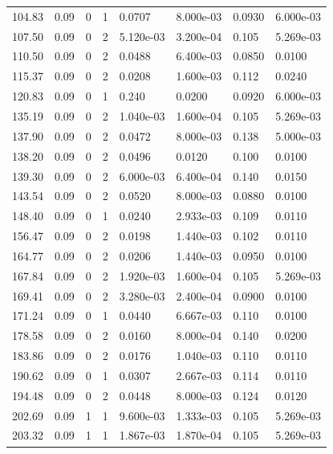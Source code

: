 \documentclass[preview]{standalone}
\begin{document}
{{\begin{tabular}{L{1.2cm}C{1.2cm} C{0.3cm}C{0.5cm} C{1.4cm}C{1.4cm} C{1.4cm}C{1.4cm}}
  104.83  &  0.09  & 0     &  1 &  0.0707  & 8.000e-03  & 0.0930 &  6.000e-03   \\ 
  107.50  &  0.09  & 0     &  2 &  5.120e-03  & 3.200e-04  & 0.105 &  5.269e-03   \\ 
  110.50  &  0.09  & 0     &  2 &  0.0488  & 6.400e-03  & 0.0850 &  0.0100   \\ 
  115.37  &  0.09  & 0     &  2 &  0.0208  & 1.600e-03  & 0.112 &  0.0240   \\ 
  120.83  &  0.09  & 0     &  1 &  0.240  & 0.0200  & 0.0920 &  6.000e-03   \\ 
  135.19  &  0.09  & 0     &  2 &  1.040e-03  & 1.600e-04  & 0.105 &  5.269e-03   \\ 
  137.90  &  0.09  & 0     &  2 &  0.0472  & 8.000e-03  & 0.138 &  5.000e-03   \\ 
  138.20  &  0.09  & 0     &  2 &  0.0496  & 0.0120  & 0.100 &  0.0100   \\ 
  139.30  &  0.09  & 0     &  2 &  6.000e-03  & 6.400e-04  & 0.140 &  0.0150   \\ 
  143.54  &  0.09  & 0     &  2 &  0.0520  & 8.000e-03  & 0.0880 &  0.0100   \\ 
  148.40  &  0.09  & 0     &  1 &  0.0240  & 2.933e-03  & 0.109 &  0.0110   \\ 
  156.47  &  0.09  & 0     &  2 &  0.0198  & 1.440e-03  & 0.102 &  0.0110   \\ 
  164.77  &  0.09  & 0     &  2 &  0.0206  & 1.440e-03  & 0.0950 &  0.0100   \\ 
  167.84  &  0.09  & 0     &  2 &  1.920e-03  & 1.600e-04  & 0.105 &  5.269e-03   \\ 
  169.41  &  0.09  & 0     &  2 &  3.280e-03  & 2.400e-04  & 0.0900 &  0.0100   \\ 
  171.24  &  0.09  & 0     &  1 &  0.0440  & 6.667e-03  & 0.110 &  0.0100   \\ 
  178.58  &  0.09  & 0     &  2 &  0.0160  & 8.000e-04  & 0.140 &  0.0200   \\ 
  183.86  &  0.09  & 0     &  2 &  0.0176  & 1.040e-03  & 0.110 &  0.0110   \\ 
  190.62  &  0.09  & 0     &  1 &  0.0307  & 2.667e-03  & 0.114 &  0.0110   \\ 
  194.48  &  0.09  & 0     &  2 &  0.0448  & 8.000e-03  & 0.124 &  0.0120   \\ 
  202.69  &  0.09  & 1     &  1 &  9.600e-03  & 1.333e-03  & 0.105 &  5.269e-03   \\ 
  203.32  &  0.09  & 1     &  1 &  1.867e-03  & 1.870e-04  & 0.105 &  5.269e-03   \\ 

\end{tabular}}}
\end{document}
